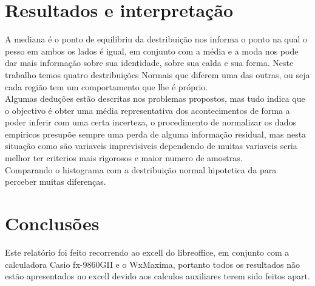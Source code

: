 \section{Resultados e interpretação}\label{Resultados}
A mediana é o ponto de equilibriu da destribuição nos informa o ponto na qual o pesso em ambos os lados é igual, em conjunto com a média e a moda nos pode dar mais informação sobre sua identidade, sobre sua calda e sua forma.
Neste trabalho temos quatro destribuições Normais que diferem uma das outras, ou seja cada região tem um comportamento que lhe é próprio.\\
Algumas deduções estão descritas nos problemas propostos, mas tudo indica que o objectivo é obter uma média representativa dos acontecimentos de forma a poder inferir com uma certa incerteza, o procedimento de normalizar os dados empiricos presupõe sempre uma perda de alguma informação residual, mas nesta situação como são variaveis imprevisiveis dependendo de muitas variaveis seria melhor ter criterios mais rigorosos e maior numero de amostras. \\
Comparando o histograma com a destribuição normal hipotetica da para perceber muitas diferenças. \\

\section{Conclusões}\label{Conclusão}
Este relatório foi feito recorrendo ao excell do libreoffice, em conjunto com a calculadora Casio fx-9860GII e o WxMaxima, portanto todos os resultados não estão apresentados no excell devido aos calculos auxiliares terem sido feitos apart.

